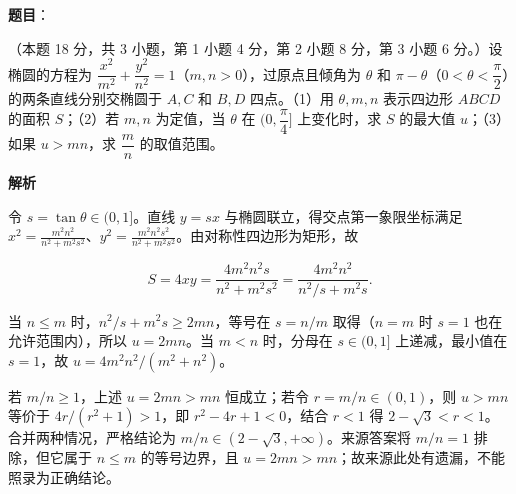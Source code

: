 \begin{answer}

\textbf{题目}：

（本题 18 分，共 3 小题，第 1 小题 4 分，第 2 小题 8 分，第 3 小题 6 分。）设椭圆的方程为 $\dfrac{x^2}{m^2}+\dfrac{y^2}{n^2}=1$（$m,n>0$），过原点且倾角为 $\theta$ 和 $\pi-\theta$（$0<\theta<\dfrac\pi2$）的两条直线分别交椭圆于 $A,C$ 和 $B,D$ 四点。（1）用 $\theta,m,n$ 表示四边形 $ABCD$ 的面积 $S$；（2）若 $m,n$ 为定值，当 $\theta$ 在 $(0,\dfrac\pi4]$ 上变化时，求 $S$ 的最大值 $u$；（3）如果 $u>mn$，求 $\dfrac mn$ 的取值范围。

\textbf{解析}

令 $s=\tan\theta\in(0,1]$。直线 $y=sx$ 与椭圆联立，得交点第一象限坐标满足 $x^2=\frac{m^2n^2}{n^2+m^2s^2}$、$y^2=\frac{m^2n^2s^2}{n^2+m^2s^2}$。由对称性四边形为矩形，故

\nopagebreak[4]
\[S=4xy=\frac{4m^2n^2s}{n^2+m^2s^2}=\frac{4m^2n^2}{n^2/s+m^2s}.\]

当 $n\le m$ 时，$n^2/s+m^2s\ge2mn$，等号在 $s=n/m$ 取得（$n=m$ 时 $s=1$ 也在允许范围内），所以 $u=2mn$。当 $m<n$ 时，分母在 $s\in(0,1]$ 上递减，最小值在 $s=1$，故 $u=4m^2n^2/(m^2+n^2)$。

若 $m/n\ge1$，上述 $u=2mn>mn$ 恒成立；若令 $r=m/n\in(0,1)$，则 $u>mn$ 等价于 $4r/(r^2+1)>1$，即 $r^2-4r+1<0$，结合 $r<1$ 得 $2-\sqrt3<r<1$。合并两种情况，严格结论为 $m/n\in(2-\sqrt3,+\infty)$。来源答案将 $m/n=1$ 排除，但它属于 $n\le m$ 的等号边界，且 $u=2mn>mn$；故来源此处有遗漏，不能照录为正确结论。


\end{answer}
